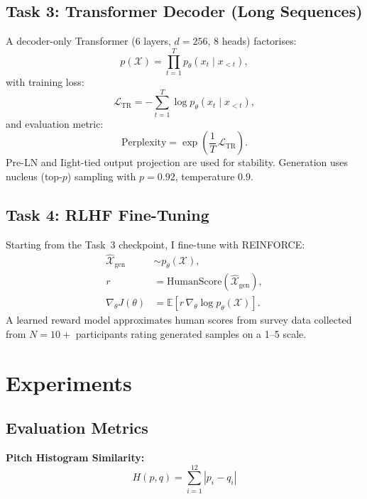 \documentclass{article}
\begin{document}
\subsection{Task 3: Transformer Decoder (Long Sequences)}

A decoder-only Transformer (6 layers, $d=256$, 8 heads) factorises:
\begin{equation}
  p(\mathcal{X}) = \prod_{t=1}^{T} p_\theta(x_t \mid x_{<t}),
\end{equation}
with training loss:
\begin{equation}
  \mathcal{L}_{\text{TR}} = -\sum_{t=1}^{T} \log p_\theta(x_t \mid x_{<t}),
\end{equation}
and evaluation metric:
\begin{equation}
  \mathrm{Perplexity} = \exp\!\left(\frac{1}{T}\,\mathcal{L}_{\text{TR}}\right).
\end{equation}
Pre-LN and Iight-tied output projection are used for stability.
Generation uses nucleus (top-$p$) sampling with $p=0.92$, temperature $0.9$.

\subsection{Task 4: RLHF Fine-Tuning}

Starting from the Task~3 checkpoint, I fine-tune with REINFORCE:
\begin{align}
  \hat{\mathcal{X}}_{\text{gen}} &\sim p_\theta(\mathcal{X}), \\
  r &= \text{HumanScore}(\hat{\mathcal{X}}_{\text{gen}}), \\
  \nabla_\theta J(\theta) &= \mathbb{E}\!\left[r\,\nabla_\theta \log p_\theta(\mathcal{X})\right].
\end{align}
A learned reward model approximates human scores from survey data collected
from $N=10+$ participants rating generated samples on a 1–5 scale.

\section{Experiments}

\subsection{Evaluation Metrics}

\textbf{Pitch Histogram Similarity:}
\begin{equation}
  H(p,q) = \sum_{i=1}^{12} |p_i - q_i|
\end{equation}
\end{document}
